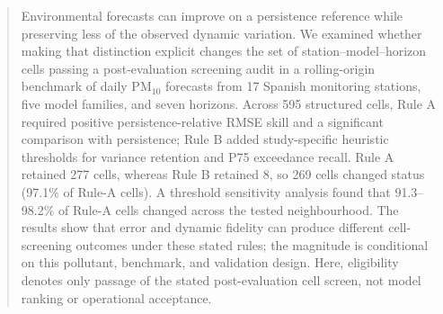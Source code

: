 \begin{abstract}
Environmental forecasts can improve on a persistence reference while
preserving less of the observed dynamic variation. We examined whether
making that distinction explicit changes the set of station--model--horizon
cells passing a post-evaluation screening audit in a rolling-origin
benchmark of daily PM$_{10}$ forecasts from 17 Spanish monitoring stations,
five model families, and seven horizons. Across 595 structured cells, Rule A
required positive persistence-relative RMSE skill and a significant
comparison with persistence; Rule B added study-specific heuristic
thresholds for variance retention and P75 exceedance recall. Rule A retained
277 cells, whereas Rule B retained 8, so 269 cells changed status (97.1\% of
Rule-A cells).
A threshold sensitivity analysis found that 91.3--98.2\% of Rule-A cells
changed across the tested neighbourhood. The results show that error and
dynamic fidelity can produce different cell-screening outcomes under these
stated rules; the magnitude is conditional on this pollutant, benchmark, and
validation design. Here, eligibility denotes only passage of the stated
post-evaluation cell screen, not model ranking or operational acceptance.
\end{abstract}
